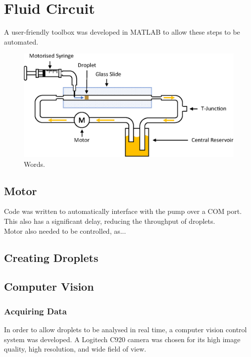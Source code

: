 \documentclass{physics_article_B}
\begin{document}
\section{Fluid Circuit\label{sect_loop}}
A user-friendly toolbox was developed in MATLAB to allow these steps to be automated.

\begin{figure}[H]
\centering
\hspace*{-0.9cm}\includegraphics[scale=0.8]{Figures/Fluid.eps}
\captionsetup{justification=centering}
\caption{Words.} 	
\label{fig:basic}
\end{figure} 


\subsection{Motor}
Code was written to automatically interface with the pump over a COM port. This also has a significant delay, reducing the throughput of droplets.\\

Motor also needed to be controlled, as...

\subsection{Creating Droplets}

\subsection{Computer Vision\label{sect_vision}}
    
    \subsubsection{Acquiring Data}
    In order to allow droplets to be analysed in real time, a computer vision control system was developed. A Logitech C920 camera was chosen for its high image quality, high resolution, and wide field of view. \\
    
\end{document}
